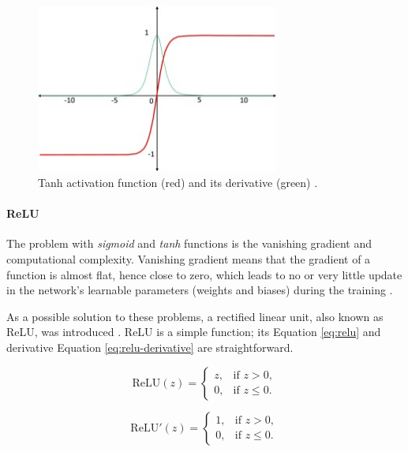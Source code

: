 \begin{figure}[H]
\begin{centering}
\includegraphics[width=8cm]{assets/images/tanh.jpg}
\par\end{centering}
\caption{Tanh activation function (red) and its derivative (green) \cite{Santosh2022-2}.}
\label{fig:tanh}
\end{figure}

\paragraph{ReLU}
The problem with \textit{sigmoid} and \textit{tanh} functions is the vanishing gradient and computational complexity. Vanishing gradient means that the gradient of a function is almost flat, hence close to zero, which leads to no or very little update in the network's learnable parameters (weights and biases) during the training \cite{Dubey2022, Aby2025}.

As a possible solution to these problems, a rectified linear unit, also known as ReLU, was introduced \cite{Nair2010}. ReLU is a simple function; its Equation \ref{eq:relu} and derivative Equation \ref{eq:relu-derivative} are straightforward.

\noindent
\begin{multicols}{2} %
    \begin{equation}
    \text{ReLU}(z) =
    \begin{cases} 
        z, & \text{if } z > 0, \\
        0, & \text{if } z \leq 0.
    \end{cases}
    \label{eq:relu}
    \end{equation}

    \begin{equation}
    \text{ReLU}'(z) =
    \begin{cases} 
        1, & \text{if } z > 0, \\
        0, & \text{if } z \leq 0.
    \end{cases}
    \label{eq:relu-derivative}
    \end{equation}
\end{multicols}

